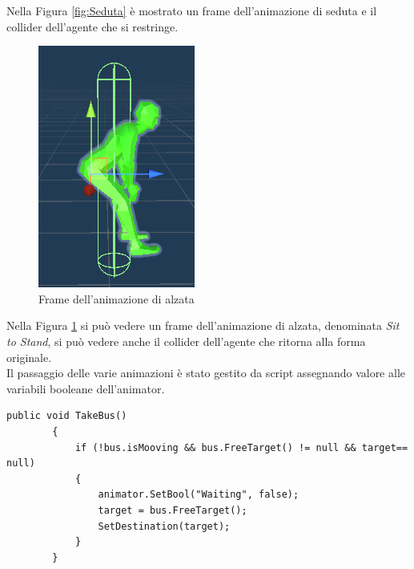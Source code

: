 \documentclass[12pt, openany]{book}
\begin{document}
	Nella Figura \ref{fig:Seduta} è mostrato un frame dell'animazione di seduta e il collider dell'agente che si restringe.
	\begin{figure}[H]
		\centering
		\includegraphics[width=0.8\linewidth]{"Immagini/inPiedi.png"}
		\caption{Frame dell'animazione di alzata}
		\label{fig:Alzata}
	\end{figure}
	Nella Figura \ref{fig:Alzata} si può vedere un frame dell'animazione di alzata, denominata \emph{Sit to Stand}, si può vedere anche il collider dell'agente che ritorna alla forma originale.\\
	Il passaggio delle varie animazioni è stato gestito da script assegnando valore alle variabili booleane dell'animator.
	\begin{lstlisting}[language={[Sharp]C}, 
		caption={Metodo che permette agli agenti di prendere posto sull'autobus}, label={TakeBus}]
		public void TakeBus()
		{
			if (!bus.isMooving && bus.FreeTarget() != null && target== null)
			{
				animator.SetBool("Waiting", false);
				target = bus.FreeTarget();
				SetDestination(target);
			}
		}
	\end{lstlisting}	
\end{document}
